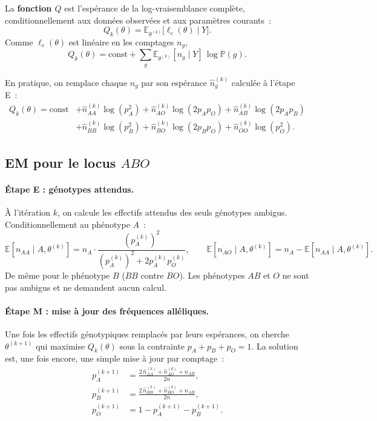 \medskip

\begin{mdframed}
\begin{definition}
La \textbf{fonction $Q$} est l'espérance de la log-vraisemblance complète,
conditionnellement aux données observées et aux paramètres courants~:
$$
Q_k(\theta) = \mathbb{E}_{\theta^{(k)}}\!\big[\ell_c(\theta) \mid Y\big].
$$
Comme $\ell_c(\theta)$ est linéaire en les comptages $n_g$,
$$
Q_k(\theta) = \text{const}
            + \sum_{g} \mathbb{E}_{\theta^{(k)}}[n_g \mid Y]\, \log \mathbb{P}(g).
$$
\end{definition}
\end{mdframed}

En pratique, on remplace chaque $n_g$ par son espérance $\hat{n}_g^{(k)}$ calculée
à l'étape E~:
\begin{align*}
Q_k(\theta) = \text{const}
  &+ \hat{n}_{AA}^{(k)} \log(p_A^2) + \hat{n}_{AO}^{(k)} \log(2 p_A p_O)
     + \hat{n}_{AB}^{(k)} \log(2 p_A p_B) \\
  &+ \hat{n}_{BB}^{(k)} \log(p_B^2) + \hat{n}_{BO}^{(k)} \log(2 p_B p_O)
     + \hat{n}_{OO}^{(k)} \log(p_O^2).
\end{align*}

\subsection{EM pour le locus $ABO$}

\paragraph{Étape E : génotypes attendus.}
À l'itération $k$, on calcule les effectifs attendus des seuls génotypes
ambigus. Conditionnellement au phénotype $A$~:
$$
\mathbb{E}[n_{AA} \mid A, \theta^{(k)}]
  = n_A \cdot \frac{(p_A^{(k)})^2}{(p_A^{(k)})^2 + 2 p_A^{(k)} p_O^{(k)}}, \qquad
\mathbb{E}[n_{AO} \mid A, \theta^{(k)}]
  = n_A - \mathbb{E}[n_{AA} \mid A, \theta^{(k)}].
$$
De même pour le phénotype $B$ ($BB$ contre $BO$). Les phénotypes $AB$ et $O$ ne
sont pas ambigus et ne demandent aucun calcul.

\paragraph{Étape M : mise à jour des fréquences alléliques.}
Une fois les effectifs génotypiques remplacés par leurs espérances, on cherche
$\theta^{(k+1)}$ qui maximise $Q_k(\theta)$ sous la contrainte
$p_A + p_B + p_O = 1$. La solution est, une fois encore, une simple mise à jour
par comptage~:
\begin{align*}
p_A^{(k+1)} &= \frac{2\,\hat{n}_{AA}^{(k)} + \hat{n}_{AO}^{(k)} + n_{AB}}{2n}, \\
p_B^{(k+1)} &= \frac{2\,\hat{n}_{BB}^{(k)} + \hat{n}_{BO}^{(k)} + n_{AB}}{2n}, \\
p_O^{(k+1)} &= 1 - p_A^{(k+1)} - p_B^{(k+1)}.
\end{align*}

